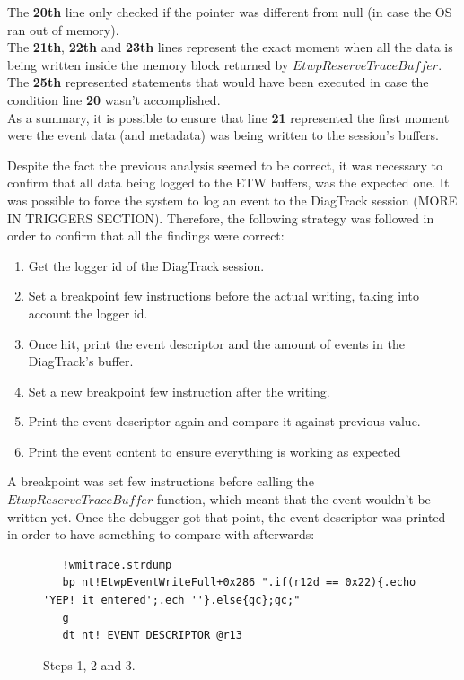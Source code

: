 The {\bfseries 20th} line only checked if the pointer was different from null (in case the OS ran out of memory). \\
The {\bfseries 21th}, {\bfseries 22th} and {\bfseries 23th} lines represent the exact moment when all the data is being written inside the memory block returned by $EtwpReserveTraceBuffer$.\\
The {\bfseries 25th} represented statements that would have been executed in case the condition line {\bfseries 20} wasn't accomplished.\\

As a summary, it is possible to ensure that line {\bfseries 21} represented the first moment were the event data (and metadata) was being written to the session's buffers.

Despite the fact the previous analysis seemed to be correct, it was necessary to confirm that all data being logged to the ETW buffers, was the expected one. 
It was possible to force the system to log an event to the DiagTrack session (MORE IN TRIGGERS SECTION). Therefore, the following strategy was followed in order to confirm that all the findings were correct:
\begin{enumerate}
\setlength\itemsep{0.05em}
\item Get the logger id of the DiagTrack session.
\item Set a breakpoint few instructions before the actual writing, taking into account the logger id.
\item Once hit, print the event descriptor and the amount of events in the DiagTrack's buffer.
\item Set a new breakpoint few instruction after the writing. 
\item Print the event descriptor again and compare it against previous value. 
\item Print the event content to ensure everything is working as expected
\end{enumerate}

A breakpoint was set few instructions before calling the $EtwpReserveTraceBuffer$ function, which meant that the event wouldn't be written yet. Once the debugger got that point, the event descriptor was printed in order to have something to compare with afterwards: 

\begin{figure}[H]
  \begin{lstlisting}
   !wmitrace.strdump
   bp nt!EtwpEventWriteFull+0x286 ".if(r12d == 0x22){.echo 'YEP! it entered';.ech ''}.else{gc};gc;"
   g
   dt nt!_EVENT_DESCRIPTOR @r13
  \end{lstlisting} 
  \caption[]{Steps 1, 2 and 3.}
  \label{fig:powershell_cmd}
\end{figure}


